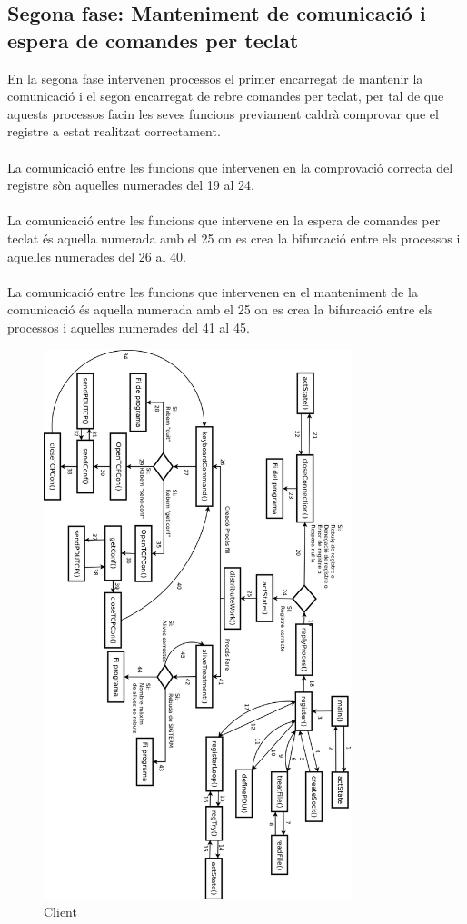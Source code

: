 \documentclass[11pt]{article}
\begin{document}
\subsection*{Segona fase: Manteniment de comunicació i espera de comandes per teclat}
En la segona fase intervenen processos el primer encarregat de mantenir la comunicació i el segon encarregat de rebre comandes per teclat, per tal de que aquests processos facin les seves funcions previament caldrà comprovar que el registre a estat realitzat correctament.\\\\
La comunicació entre les funcions que intervenen en la comprovació correcta del registre sòn aquelles numerades del 19 al 24.\\\\
La comunicació entre les funcions que intervene en la espera de comandes per teclat és aquella numerada amb el 25 on es crea la bifurcació entre els processos i aquelles numerades del 26 al 40.\\\\
La comunicació entre les funcions que intervenen en el manteniment de la comunicació és aquella numerada amb el 25 on es crea la bifurcació entre els processos i aquelles numerades del 41 al 45.
\afterpage{\clearpage}
\begin{figure}[h]
    \includegraphics[width=0.8\textwidth]{Client.png}
    \caption{Client}
    \label{fig:Client}
\end{figure}
\newpage
\end{document}
